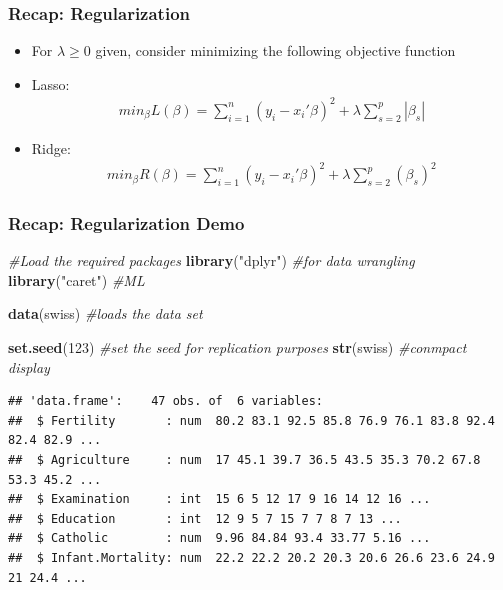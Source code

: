 \documentclass[
  shownotes,
  xcolor={svgnames},
  hyperref={colorlinks,citecolor=DarkBlue,linkcolor=DarkRed,urlcolor=DarkBlue}
  , aspectratio=169]{beamer}
\newenvironment{Shaded}{\begin{snugshade}}{\end{snugshade}}
\newcommand{\CommentTok}[1]{\textcolor[rgb]{0.56,0.35,0.01}{\textit{#1}}}
\newcommand{\DecValTok}[1]{\textcolor[rgb]{0.00,0.00,0.81}{#1}}
\newcommand{\KeywordTok}[1]{\textcolor[rgb]{0.13,0.29,0.53}{\textbf{#1}}}
\newcommand{\NormalTok}[1]{#1}
\newcommand{\StringTok}[1]{\textcolor[rgb]{0.31,0.60,0.02}{#1}}
\begin{document}
\begin{frame}[fragile]
\frametitle{Recap: Regularization}


\begin{itemize}
\item For $\lambda \geq 0$ given, consider minimizing the following objective function
\item Lasso:
\begin{align}
min_{\beta} L(\beta) = \sum_{i=1}^n (y_i-x_i'\beta)^2 + \lambda \sum_{s=2}^p |\beta_s| 
\end{align}
\item Ridge:
\begin{align}
min_{\beta} R(\beta) = \sum_{i=1}^n (y_i-x_i'\beta)^2 + \lambda \sum_{s=2}^p (\beta_s)^2
\end{align}
\end{itemize}

\end{frame}
\begin{frame}[fragile]
\frametitle{Recap: Regularization Demo}

\begin{scriptsize}
   
\begin{Shaded}
\begin{Highlighting}[]
\CommentTok{\#Load the required packages}
\KeywordTok{library}\NormalTok{(}\StringTok{"dplyr"}\NormalTok{) }\CommentTok{\#for data wrangling}
\KeywordTok{library}\NormalTok{(}\StringTok{"caret"}\NormalTok{) }\CommentTok{\#ML}

\KeywordTok{data}\NormalTok{(swiss) }\CommentTok{\#loads the data set}

\KeywordTok{set.seed}\NormalTok{(}\DecValTok{123}\NormalTok{) }\CommentTok{\#set the seed for replication purposes}
\KeywordTok{str}\NormalTok{(swiss) }\CommentTok{\#conmpact display}
\end{Highlighting}
\end{Shaded}
\end{scriptsize}

\begin{tiny}


\begin{verbatim}
## 'data.frame':    47 obs. of  6 variables:
##  $ Fertility       : num  80.2 83.1 92.5 85.8 76.9 76.1 83.8 92.4 82.4 82.9 ...
##  $ Agriculture     : num  17 45.1 39.7 36.5 43.5 35.3 70.2 67.8 53.3 45.2 ...
##  $ Examination     : int  15 6 5 12 17 9 16 14 12 16 ...
##  $ Education       : int  12 9 5 7 15 7 7 8 7 13 ...
##  $ Catholic        : num  9.96 84.84 93.4 33.77 5.16 ...
##  $ Infant.Mortality: num  22.2 22.2 20.2 20.3 20.6 26.6 23.6 24.9 21 24.4 ...
\end{verbatim}
\end{tiny}


\end{frame}
\end{document}
